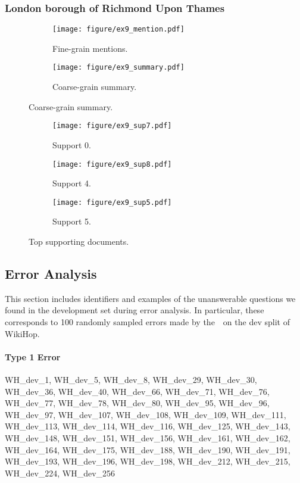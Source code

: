\documentclass{article} \usepackage{iclr2019_conference,times}
\begin{document}
\clearpage

\subsubsection{London borough of Richmond Upon Thames}

\begin{figure}[!h]
\begin{subfigure}{0.65\linewidth}
  \centering
  \texttt{[image: figure/ex9\_mention.pdf]}
  \caption{Fine-grain mentions.}
\end{subfigure}
\begin{subfigure}{0.34\linewidth}
  \centering
  \texttt{[image: figure/ex9\_summary.pdf]}
  \caption{Coarse-grain summary.}
\end{subfigure}
\end{figure}


\begin{figure}[h]
\begin{subfigure}{0.325\linewidth}
  \centering
  \caption{Support 0.}
  \texttt{[image: figure/ex9\_sup7.pdf]}
\end{subfigure}
\begin{subfigure}{0.325\linewidth}
  \centering
  \caption{Support 4.}
  \texttt{[image: figure/ex9\_sup8.pdf]}
\end{subfigure}
\begin{subfigure}{0.325\linewidth}
  \centering
  \caption{Support 5.}
  \texttt{[image: figure/ex9\_sup5.pdf]}
\end{subfigure}
\caption{Top supporting documents.}
\end{figure}



\subsection{Error Analysis}
\label{appendix:erroranalysis}

This section includes identifiers and examples of the unanswerable questions we found in the development set during error analysis.
In particular, these corresponds to 100 randomly sampled errors made by the~\modelnameshort~on the dev split of WikiHop.

\paragraph{Type 1 Error}
WH\_dev\_1, WH\_dev\_5, WH\_dev\_8, WH\_dev\_29, WH\_dev\_30, WH\_dev\_36, WH\_dev\_40, WH\_dev\_66, WH\_dev\_71, WH\_dev\_76, WH\_dev\_77, WH\_dev\_78, WH\_dev\_80, WH\_dev\_95, WH\_dev\_96, WH\_dev\_97, WH\_dev\_107, WH\_dev\_108, WH\_dev\_109, WH\_dev\_111, WH\_dev\_113, WH\_dev\_114, WH\_dev\_116, WH\_dev\_125, WH\_dev\_143, WH\_dev\_148, WH\_dev\_151, WH\_dev\_156, WH\_dev\_161, WH\_dev\_162, WH\_dev\_164, WH\_dev\_175, WH\_dev\_188, WH\_dev\_190, WH\_dev\_191, WH\_dev\_193, WH\_dev\_196, WH\_dev\_198, WH\_dev\_212, WH\_dev\_215, WH\_dev\_224, WH\_dev\_256
\end{document}
